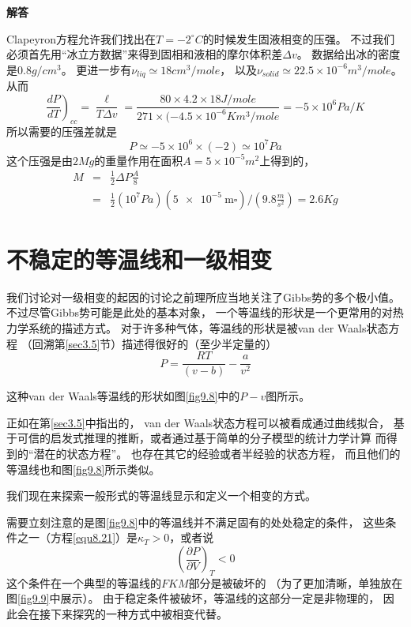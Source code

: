 {\bf 解答}

Clapeyron方程允许我们找出在$T=-2^\circ C$的时候发生固液相变的压强。
不过我们必须首先用“冰立方数据”来得到固相和液相的摩尔体积差$\Delta v$。
数据给出冰的密度是$0.8g/cm^3$。
更进一步有$\nu_{liq}\simeq 18cm^3/mole$，
以及$\nu_{solid}\simeq 22.5 \times 10^{-6} m^3/mole$。
从而
\begin{equation*}
\left.\frac{dP}{dT}\right)_{cc}=\frac{\ell}{T\Delta v}
=\frac{80\times4.2\times18J/mole}{271\times(-4.5\times10^{-6}Km^3/mole}
=-5\times10^6Pa/K
\end{equation*}
所以需要的压强差就是
\begin{equation*}
P\simeq-5\times10^6\times(-2)\simeq10^7Pa
\end{equation*}
这个压强是由$2Mg$的重量作用在面积$A=5\times10^{-5}m^2$上得到的，
\begin{equation*}
\begin{aligned}
M&=&\frac{1}{2}\Delta P\frac{A}{8}\\
&=&\frac{1}{2}(10^7Pa)(\SI{5e-5}{\meter\square})/\left(9.8\frac{m}{s^2}\right)=2.6Kg
\end{aligned}
\end{equation*}


\section{不稳定的等温线和一级相变}
\label{sec9.4}

我们讨论对一级相变的起因的讨论之前理所应当地关注了Gibbs势的多个极小值。
不过尽管Gibbs势可能是此处的基本对象，
一个等温线的形状是一个更常用的对热力学系统的描述方式。
对于许多种气体，等温线的形状是被van der Waals状态方程
（回溯第\ref{sec3.5}节）描述得很好的（至少半定量的）
\begin{equation}
\label{equ9.13}
P=\frac{RT}{(v-b)}-\frac{a}{v^2}
\end{equation}

这种van der Waals等温线的形状如图\ref{fig9.8}中的$P-v$图所示。

正如在第\ref{sec3.5}中指出的，
van der Waals状态方程可以被看成通过曲线拟合，
基于可信的启发式推理的推断，或者通过基于简单的分子模型的统计力学计算
而得到的“潜在的状态方程”。
也存在其它的经验或者半经验的状态方程，
而且他们的等温线也和图\ref{fig9.8}所示类似。

我们现在来探索一般形式的等温线显示和定义一个相变的方式。

需要立刻注意的是图\ref{fig9.8}中的等温线并不满足固有的处处稳定的条件，
这些条件之一（方程\eqref{equ8.21}）是$\kappa_T>0$，或者说
\begin{equation}
\label{equ9.14}
\left(\frac{\partial P}{\partial V}\right)_T<0
\end{equation}
这个条件在一个典型的等温线的$FKM$部分是被破坏的
（为了更加清晰，单独放在图\ref{fig9.9}中展示）。
由于稳定条件被破坏，等温线的这部分一定是非物理的，
因此会在接下来探究的一种方式中被相变代替。

